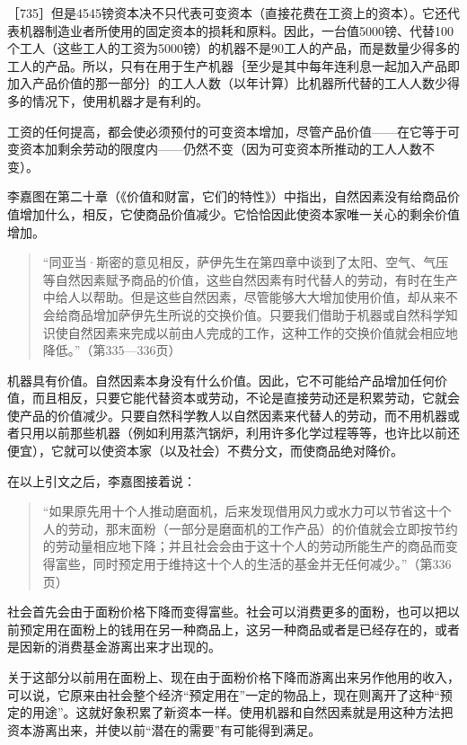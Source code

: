 ［735］但是4545镑资本决不只代表可变资本（直接花费在工资上的资本）。它还代表机器制造业者所使用的固定资本的损耗和原料。因此，一台值5000镑、代替100个工人（这些工人的工资为5000镑）的机器不是90工人的产品，而是数量少得多的工人的产品。所以，只有在用于生产机器｛至少是其中每年连利息一起加入产品即加入产品价值的那一部分｝的工人人数（以年计算）比机器所代替的工人人数少得多的情况下，使用机器才是有利的。

工资的任何提高，都会使必须预付的可变资本增加，尽管产品价值——在它等于可变资本加剩余劳动的限度内——仍然不变（因为可变资本所推动的工人人数不变）。


李嘉图在第二十章（《价值和财富，它们的特性》）中指出，自然因素没有给商品价值增加什么，相反，它使商品价值减少。它恰恰因此使资本家唯一关心的剩余价值增加。

\begin{quote}{“同亚当·斯密的意见相反，萨伊先生在第四章中谈到了太阳、空气、气压等自然因素赋予商品的价值，这些自然因素有时代替人的劳动，有时在生产中给人以帮助。但是这些自然因素，尽管能够大大增加使用价值，却从来不会给商品增加萨伊先生所说的交换价值。只要我们借助于机器或自然科学知识使自然因素来完成以前由人完成的工作，这种工作的交换价值就会相应地降低。”（第335—336页）}\end{quote}

机器具有价值。自然因素本身没有什么价值。因此，它不可能给产品增加任何价值，而且相反，只要它能代替资本或劳动，不论是直接劳动还是积累劳动，它就会使产品的价值减少。只要自然科学教人以自然因素来代替人的劳动，而不用机器或者只用以前那些机器（例如利用蒸汽锅炉，利用许多化学过程等等，也许比以前还便宜），它就可以使资本家（以及社会）不费分文，而使商品绝对降价。

在以上引文之后，李嘉图接着说：

\begin{quote}{“如果原先用十个人推动磨面机，后来发现借用风力或水力可以节省这十个人的劳动，那末面粉（一部分是磨面机的工作产品）的价值就会立即按节约的劳动量相应地下降；并且社会会由于这十个人的劳动所能生产的商品而变得富些，同时预定用于维持这十个人的生活的基金并无任何减少。”（第336页）}\end{quote}

社会首先会由于面粉价格下降而变得富些。社会可以消费更多的面粉，也可以把以前预定用在面粉上的钱用在另一种商品上，这另一种商品或者是已经存在的，或者是因新的消费基金游离出来才出现的。

关于这部分以前用在面粉上、现在由于面粉价格下降而游离出来另作他用的收入，可以说，它原来由社会整个经济“预定用在”一定的物品上，现在则离开了这种“预定的用途”。这就好象积累了新资本一样。使用机器和自然因素就是用这种方法把资本游离出来，并使以前“潜在的需要”有可能得到满足。

